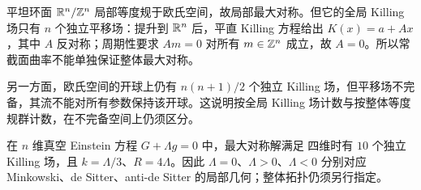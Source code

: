 \begin{example}[局部与整体]
    平坦环面 $\mathbb{R}^n/\mathbb{Z}^n$ 局部等度规于欧氏空间，故局部最大对称。但它的全局 Killing 场只有 $n$ 个独立平移场：提升到 $\mathbb{R}^n$ 后，平直 Killing 方程给出 $K(x)=a+Ax$，其中 $A$ 反对称；周期性要求 $Am=0$ 对所有 $m\in\mathbb{Z}^n$ 成立，故 $A=0$。所以常截面曲率不能单独保证整体最大对称。

    另一方面，欧氏空间的开球上仍有 $n(n+1)/2$ 个独立 Killing 场，但平移场不完备，其流不能对所有参数保持该开球。这说明按全局 Killing 场计数与按整体等度规群计数，在不完备空间上仍须区分。
\end{example}

\begin{remark}
    在 $n$ 维真空 Einstein 方程 $G+\Lambda g=0$ 中，最大对称解满足
    四维时有 $10$ 个独立 Killing 场，且 $k=\Lambda/3$、$R=4\Lambda$。因此 $\Lambda=0$、$\Lambda>0$、$\Lambda<0$ 分别对应 Minkowski、de Sitter、anti-de Sitter 的局部几何；整体拓扑仍须另行指定。
\end{remark}

